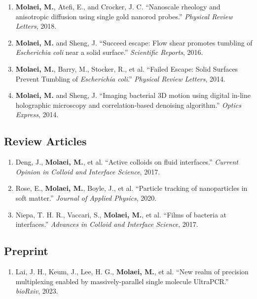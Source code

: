 \documentclass[11pt]{article}
\newlength{\cvindent}
\newenvironment{cvblock}{%
  \begin{list}{}{%
    \setlength{\leftmargin}{\cvindent}%
    \setlength{\rightmargin}{0pt}%
    \setlength{\labelwidth}{0pt}%
    \setlength{\labelsep}{0pt}%
    \setlength{\itemindent}{0pt}%
    \setlength{\listparindent}{0pt}%
    \setlength{\topsep}{0pt}%
    \setlength{\partopsep}{0pt}%
    \setlength{\parsep}{0pt}%
    \setlength{\itemsep}{0pt}%
  }
  \item[]
}{%
  \end{list}
}
\newcommand{\pubitem}[1]{\item #1}
\begin{document}
\begin{cvblock}
\begin{enumerate}
    \pubitem{\textbf{Molaei, M.}, Atefi, E., and Crocker, J. C. ``Nanoscale rheology and anisotropic diffusion using single gold nanorod probes.'' \textit{Physical Review Letters}, 2018.}
    \pubitem{\textbf{Molaei, M.} and Sheng, J. ``Succeed escape: Flow shear promotes tumbling of \textit{Escherichia coli} near a solid surface.'' \textit{Scientific Reports}, 2016.}
    \pubitem{\textbf{Molaei, M.}, Barry, M., Stocker, R., et al. ``Failed Escape: Solid Surfaces Prevent Tumbling of \textit{Escherichia coli}.'' \textit{Physical Review Letters}, 2014.}
    \pubitem{\textbf{Molaei, M.} and Sheng, J. ``Imaging bacterial 3D motion using digital in-line holographic microscopy and correlation-based denoising algorithm.'' \textit{Optics Express}, 2014.}
\end{enumerate}
\end{cvblock}

\subsection*{Review Articles}
\begin{cvblock}
\begin{enumerate}
    \pubitem{Deng, J., \textbf{Molaei, M.}, et al. ``Active colloids on fluid interfaces.'' \textit{Current Opinion in Colloid and Interface Science}, 2017.}
    \pubitem{Rose, E., \textbf{Molaei, M.}, Boyle, J., et al. ``Particle tracking of nanoparticles in soft matter.'' \textit{Journal of Applied Physics}, 2020.}
    \pubitem{Niepa, T. H. R., Vaccari, S., \textbf{Molaei, M.}, et al. ``Films of bacteria at interfaces.'' \textit{Advances in Colloid and Interface Science}, 2017.}
\end{enumerate}
\end{cvblock}

\subsection*{Preprint}
\begin{cvblock}
\begin{enumerate}
    \pubitem{Lai, J. H., Keum, J., Lee, H. G., \textbf{Molaei, M.}, et al. ``New realm of precision multiplexing enabled by massively-parallel single molecule UltraPCR.'' \textit{bioRxiv}, 2023.}
\end{enumerate}
\end{cvblock}
\end{document}
